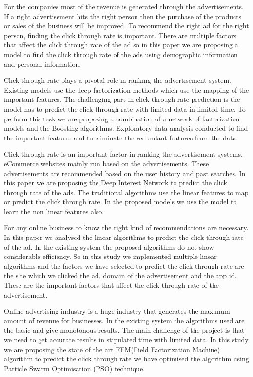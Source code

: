 \documentclass[conference]{IEEEtran}
\begin{document}
For the companies most of the revenue is generated through the advertisements. If a right advertisement hits the right person then the purchase of the products or sales of the business will be improved. To recommend the right ad for the right person, finding the click through rate is important. There are multiple factors that affect the click through rate of the ad so  in this paper we are proposing a model to find the click through rate of the ads using demographic information and personal information\cite{6748641}.

Click through rate plays a pivotal role in ranking the advertisement system. Existing models use the deep factorization methods which use the mapping of the important features. The challenging part in click through rate prediction is the model has to predict the click through rate with limited data in limited time. To perform this task we are proposing a combination of a network of factorization models and the Boosting algorithms. Exploratory data analysis conducted to find the important features and to eliminate the redundant features from the data\cite{9420546}.

Click through rate is an important factor in ranking the advertisement systems. eCommerce websites mainly run based on the advertisements. These advertisements are recommended based on the user history and past searches. In this paper we are proposing the Deep Interest Network to predict the click through rate of the ads. The traditional algorithms use the linear features to map or predict the click through rate. In the proposed models we use the model to learn the non linear features also\cite{9445990}.

For any online business to know the right kind of recommendations are necessary. In this paper we analysed the linear algorithms to predict the click through rate of the ad. In the existing system the proposed algorithms do not show considerable efficiency. So in this study we implemented multiple linear algorithms and the factors we have selected to predict the click through rate are the site which we clicked the ad, domain of the advertisement and the app id. These are the important factors that affect the click through rate of the advertisement\cite{7489611}.

Online advertising industry is a huge industry that generates the maximum amount of revenue for businesses. In the existing system the algorithms used are the basic and give monotonous results. The main challenge of the project is that we need to get accurate results in stipulated time with limited data. In this study we are proposing the state of the art FFM(Field Factorization Machine) algorithm to predict the click through rate we have optimised the algorithm using Particle Swarm Optimisation (PSO) technique\cite{8463219}.
\end{document}
